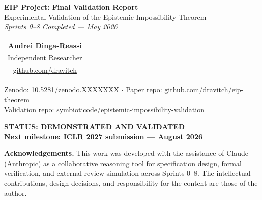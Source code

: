 \documentclass[11pt,a4paper]{article}
\theoremstyle{plain}
\begin{document}
\begin{titlepage}
\centering
\vspace*{1.5cm}

{\LARGE\bfseries EIP Project: Final Validation Report}\\[0.5em]
{\large Experimental Validation of the Epistemic Impossibility Theorem}\\[0.3em]
{\large\itshape Sprints 0--8 Completed --- May 2026}

\vspace{0.8cm}
\begin{tabular}{c}
\textbf{Andrei Dinga-Reassi}\\[0.2em]
Independent Researcher\\[0.2em]
\href{https://github.com/dravitch}{github.com/dravitch}
\end{tabular}

\vspace{0.6cm}
{\small
Zenodo: \href{https://doi.org/10.5281/zenodo.XXXXXXX}{10.5281/zenodo.XXXXXXX}
\quad$\cdot$\quad
Paper repo: \href{https://github.com/dravitch/eip-theorem}{github.com/dravitch/eip-theorem}\\
Validation repo: \href{https://github.com/symbioticode/epistemic-impossibility-validation}{symbioticode/epistemic-impossibility-validation}
}

\vspace{1cm}
\begin{mdframed}[linecolor=green!50!black,backgroundcolor=green!5]
\centering\large\bfseries
STATUS: DEMONSTRATED AND VALIDATED \checkmark\\[0.3em]
\normalsize Next milestone: ICLR 2027 submission --- August 2026
\end{mdframed}

\vspace{0.8cm}
\begin{mdframed}[linecolor=gray!40,backgroundcolor=gray!4]
\small\textbf{Acknowledgements.}
This work was developed with the assistance of Claude (Anthropic) as a
collaborative reasoning tool for specification design, formal verification,
and external review simulation across Sprints 0--8. The intellectual
contributions, design decisions, and responsibility for the content are those
of the author.
\end{mdframed}
\end{titlepage}

\tableofcontents
\newpage
\end{document}
